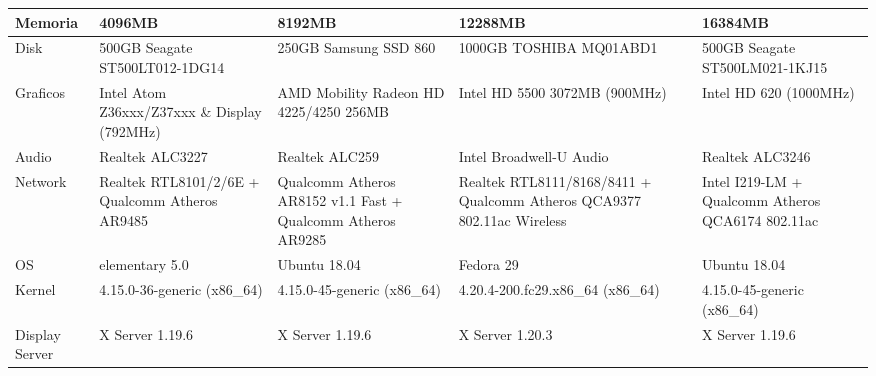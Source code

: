 \documentclass{article}
\begin{document}
\begin{table}
\begin{tabularx}{\linewidth}{|L|L|L|L|L|}
Memoria                & 4096MB                                                 & 8192MB                                                      & 12288MB                                                                & 16384MB                                                  \\ \hline
{}Disk                   & 500GB Seagate ST500LT012-1DG14                         & 250GB Samsung SSD 860                                       & 1000GB TOSHIBA MQ01ABD1                                                & 500GB Seagate ST500LM021-1KJ15                           \\ \hline
{}Graficos               & Intel Atom Z36xxx/Z37xxx \& Display (792MHz)           & AMD Mobility Radeon HD 4225/4250 256MB                      & Intel HD 5500 3072MB (900MHz)                                          & Intel HD 620 (1000MHz)                                   \\ \hline
{}Audio                  & Realtek ALC3227                                        & Realtek ALC259                                              & Intel Broadwell-U Audio                                                & Realtek ALC3246                                          \\ \hline
{}Network                & Realtek RTL8101/2/6E + Qualcomm Atheros AR9485         & Qualcomm Atheros AR8152 v1.1 Fast + Qualcomm Atheros AR9285 & Realtek RTL8111/8168/8411 + Qualcomm Atheros QCA9377 802.11ac Wireless & Intel I219-LM + Qualcomm Atheros QCA6174 802.11ac        \\ \hline
{}OS                     & elementary 5.0                                         & Ubuntu 18.04                                                & Fedora 29                                                              & Ubuntu 18.04                                             \\ \hline
{}Kernel                 & 4.15.0-36-generic (x86\_64)                            & 4.15.0-45-generic (x86\_64)                                 & 4.20.4-200.fc29.x86\_64 (x86\_64)                                      & 4.15.0-45-generic (x86\_64)                              \\ \hline
{}Display Server         & X Server 1.19.6                                        & X Server 1.19.6                                             & X Server 1.20.3                                                        & X Server 1.19.6                                          \\ \hline

\end{tabularx}
\end{table}
\end{document}

